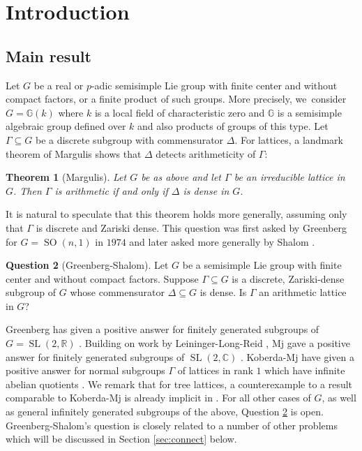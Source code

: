 \documentclass[11pt]{article}
\numberwithin{equation}{section}\providecommand{\llangle}{\langle\!\langle}\providecommand{\rrangle}{\rangle\!\rangle}\providecommand{\Asterisk}{\ast}
\newcommand{\G}{\ensuremath{\mathbb{G}}}
\newcommand{\bbC}{\ensuremath{\mathbb{C}}}
\newcommand{\bbR}{\ensuremath{\mathbb{R}}}
\DeclareMathOperator{\SL}{SL}
\DeclareMathOperator{\SO}{SO}
\newtheorem{thm}{Theorem}[section]
\theoremstyle{definition}
\newtheorem{question}[thm]{Question}
\begin{document}
\section{Introduction}
\label{sec:intro}

\subsection{Main result}\label{sec:mainthm} Let $G$ be a real or $p$-adic semisimple Lie group with finite center and without compact factors, or a finite product of such groups. More precisely, we~consider $G=\G(k)$ where $k$ is a local field of characteristic zero and $\G$ is a semisimple algebraic group defined over $k$ and also products of groups of this type. Let $\Gamma\subseteq G$ be a discrete subgroup with commensurator $\Delta$. For lattices, a landmark theorem of Margulis shows that $\Delta$ detects arithmeticity of $\Gamma$:
\begin{thm}[Margulis]\label{thm:margulis-comm}
Let $G$ be as above and let $\Gamma$ be an irreducible lattice in~$G$. Then $\Gamma$ is arithmetic if and only if $\Delta$ is dense in $G$.
\end{thm}
It is natural to speculate that this theorem holds more generally, assuming only that $\Gamma$ is discrete and Zariski dense. This question was first asked by Greenberg for $G=\SO(n,1)$ in $1974$ and later asked more generally by Shalom \cite{greenberg-comm, mj-comm}.

\begin{question}[{Greenberg-Shalom}]\label{q:shalom}
Let $G$ be a semisimple Lie group with finite center and without compact factors. Suppose $\Gamma\subseteq G$ is a discrete, Zariski-dense subgroup of $G$ whose commensurator $\Delta\subseteq G$ is dense. Is $\Gamma$ an arithmetic lattice in $G$?
\end{question}

Greenberg has given a positive answer for finitely generated subgroups of $G=\SL(2,\bbR)$ \cite{greenberg-comm}. Building on work by Leininger-Long-Reid \cite{llr-comm}, Mj gave a positive answer for finitely generated subgroups of $\SL(2,\bbC)$ \cite{mj-comm}. Koberda-Mj have given a positive answer for normal subgroups $\Gamma$ of lattices in rank $1$ which have infinite abelian quotients \cite{koberda-mj0,koberda-mj}. We remark that for tree lattices, a counterexample to a result comparable to Koberda-Mj is already implicit in \cite[Prop.\,8.1]{BurgerMozes}. For all other cases of $G$, as well as general infinitely generated subgroups of the above, Question \ref{q:shalom} is open. Greenberg-Shalom's question is closely related to a number of other problems which will be discussed in Section \ref{sec:connect} below.
\end{document}
